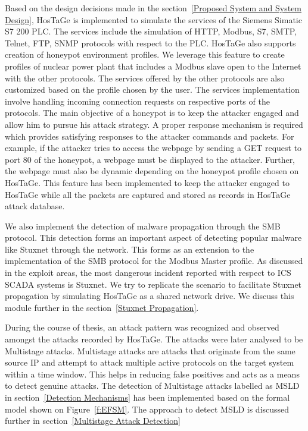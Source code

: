 \documentclass[article,msc=informatik,type=msc,colorback,accentcolor=tud9c]{tudthesis}
\begin{document}
 	Based on the design decisions made in the section~\ref{Proposed System and System Design}, HosTaGe is  implemented to simulate the services of the Siemens Simatic S7 200 \ac{PLC}. The services include the simulation of HTTP, Modbus, \ac{S7}, \ac{SMTP}, Telnet, \ac{FTP}, \ac{SNMP} protocols with respect to the \ac{PLC}. HosTaGe also supports creation of honeypot environment profiles. We leverage this feature to create profiles of nuclear power plant that includes a Modbus slave open to the Internet with the other protocols. The services offered by the other protocols are also customized based on the profile chosen by the  user. The services implementation involve handling incoming connection requests on respective ports of the protocols. The main objective of a honeypot is to keep the attacker engaged and allow him to pursue his attack strategy. A proper response mechanism is required which provides satisfying responses to the attacker commands and packets. For example, if the attacker tries to access the webpage by sending a GET request to port 80 of the honeypot, a webpage must be displayed to the attacker. Further, the webpage must also be dynamic depending on the honeypot profile chosen on HosTaGe. This feature has been implemented to keep the attacker engaged to HosTaGe while all the packets are captured and stored as records in HosTaGe attack database.
 	
 
 	We also implement the detection of malware propagation through the \ac{SMB} protocol. This detection forms an important aspect of detecting popular malware like Stuxnet through the network.  This forms as an extension to the implementation of the \ac{SMB} protocol for the Modbus Master profile. As discussed in the exploit areas, the most dangerous incident reported with respect to \ac{ICS} \ac{SCADA} systems is Stuxnet. We try to replicate the scenario to facilitate Stuxnet propagation by simulating HosTaGe as a shared network drive. We discuss this module further in the section~\ref{Stuxnet Propagation}.
 	
 	
 	During the course of thesis, an attack pattern was recognized and observed amongst the attacks recorded by HosTaGe. The attacks were later analysed to be Multistage attacks. Multistage attacks are attacks that originate from the same source \ac{IP} and attempt to attack multiple active protocols on the target system within a time window. This helps in reducing false positives and acts as a means to detect genuine attacks. The detection of Multistage attacks labelled as \ac{MSLD} in section~\ref{Detection Mechanisms} has been implemented based on the formal model shown on Figure~\ref{f:EFSM}. The approach to detect \ac{MSLD} is discussed further in section~\ref{Multistage Attack Detection} 
	
\end{document}
